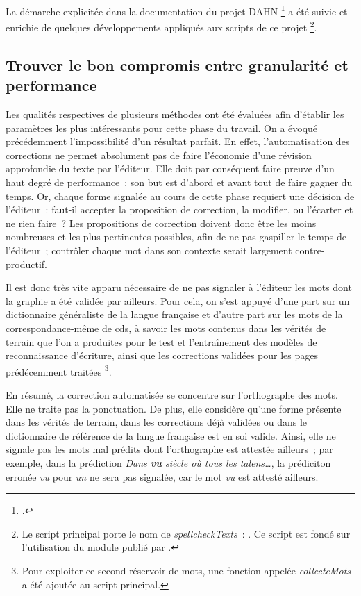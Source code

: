 \documentclass[a4paper,12pt,twoside]{book}
\begin{document}
			La démarche explicitée dans la documentation du projet DAHN%
			\footcite{chiffoleauHowPostOCRCorrection2022} a été suivie et enrichie de quelques développements appliqués aux scripts de ce projet
			\footnote{Le script principal porte le nom de \textit{spellcheckTexts}~: \cite{biaySpellcheckTextsPy2022}. Ce script est fondé sur l'utilisation du module publié par \cite{barrusPyspellcheckerPurePython}.}.
					
			\subsection{Trouver le bon compromis entre granularité et performance}
				Les qualités respectives de plusieurs méthodes ont été évaluées afin d'établir les paramètres les plus intéressants pour cette phase du travail. On a évoqué précédemment l'impossibilité d'un résultat parfait. En effet, l'automatisation des corrections ne permet absolument pas de faire l'économie d'une révision approfondie du texte par l'éditeur. Elle doit par conséquent faire preuve d'un haut degré de performance~: son but est d'abord et avant tout de faire gagner du temps. Or, chaque forme signalée au cours de cette phase requiert une décision de l'éditeur~: faut-il accepter la proposition de correction, la modifier, ou l'écarter et ne rien faire~? Les propositions de correction doivent donc être les moins nombreuses et les plus pertinentes possibles, afin de ne pas gaspiller le temps de l'éditeur~; contrôler chaque mot dans son contexte serait largement contre-productif.
				
				Il est donc très vite apparu nécessaire de ne pas signaler à l'éditeur les mots dont la graphie a été validée par ailleurs. Pour cela, on s'est appuyé d'une part sur un dictionnaire généraliste de la langue française et d'autre part sur les mots de la correspondance-même de \gls{cds}, à savoir les mots contenus dans les vérités de terrain que l'on a produites pour le test et l'entraînement des modèles de reconnaissance d'écriture, ainsi que les corrections validées pour les pages prédécemment traitées 
				\footnote{Pour exploiter ce second réservoir de mots, une fonction appelée \textit{collecteMots} a été ajoutée au script principal.}.
			
				En résumé, la correction automatisée se concentre sur l'orthographe des mots. Elle ne traite pas la ponctuation. De plus, elle considère qu'une forme présente dans les vérités de terrain, dans les corrections déjà validées ou dans le dictionnaire de référence de la langue française est en soi valide. Ainsi, elle ne signale pas les mots mal prédits dont l'orthographe est attestée ailleurs~; par exemple, dans la \gls{prédiction} \textit{Dans \textbf{vu} siècle où tous les talens…}, la prédiciton erronée \textit{vu} pour \textit{un} ne sera pas signalée, car le mot \textit{vu} est attesté ailleurs.
					
\end{document}

